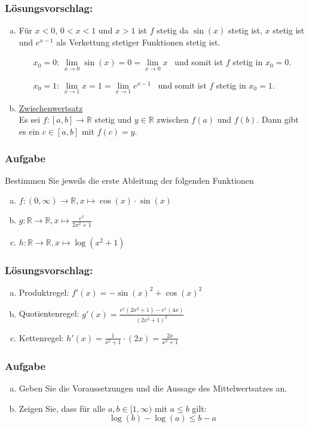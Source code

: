\documentclass[a4paper,11pt]{scrartcl}
\newcounter{auf}
\newcommand{\Aufgabe}%
        {\addtocounter{auf}{1} \subsubsection*{\rmfamily  Aufgabe \theauf \hspace{1em}} }
\newcommand{\RR}{\mathbb{R}}
\begin{document}
\subsubsection*{Lösungsvorschlag:}
\begin{enumerate}[a)]
\item Für $x<0$, $0<x<1$ und $x>1$ ist $f$ stetig da $\sin(x)$ stetig ist, $x$ stetig ist und $e^{x-1}$ als Verkettung stetiger Funktionen stetig ist.
	\begin{itemize}
	\item[$x_0=0$:] $\lim \limits_{x\to 0} \sin(x)=0=\lim \limits_{x \to 0} x$ \ und somit ist $f$ stetig in $x_0=0$.
	\item[$x_0=1$:] $\lim \limits_{x\to 1} x=1=\lim \limits_{x \to 1} e^{x-1}$ \ und somit ist $f$ stetig in $x_0=1$.
	\end{itemize}
\item \underline{Zwischenwertsatz}\\ Es sei $f:[a,b] \to \RR$ stetig und $y \in \RR$ zwischen $f(a)$ und $f(b)$. Dann gibt es ein $c \in [a,b]$ mit $f(c)=y$.
\end{enumerate}

\newpage
\Aufgabe
Bestimmen Sie jeweils die erste Ableitung der folgenden Funktionen

\begin{enumerate}[a)]
\item $f:(0,\infty) \to \RR, x \mapsto \cos(x) \cdot \sin(x)$
\item $g: \RR \to \RR, x \mapsto\frac{e^x}{2x^2+1}$
\item $h:\RR \to \RR, x \mapsto \log(x^2+1)$
\end{enumerate}
%
%
\subsubsection*{Lösungsvorschlag:}
%
\begin{enumerate}[a)]
\item Produktregel: $f'(x)=-\sin(x)^2+\cos(x)^2$
\item Quotientenregel: $g'(x)=\frac{e^x(2x^2+1)-e^x(4x)}{(2x^2+1)^2}$
\item Kettenregel: $h'(x)=\frac{1}{x^2+1}\cdot (2x)=\frac{2x}{x^2+1}$
\end{enumerate}


\newpage
\Aufgabe

\begin{enumerate}[a)]

\item Geben Sie die Voraussetzungen und die Aussage des Mittelwertsatzes an.
\item Zeigen Sie, dass für alle $a,b \in [1,\infty)$ mit $a\le b$ gilt:
$$
\log(b)-\log(a) \le b-a
$$
\end{enumerate}
%
\end{document}
